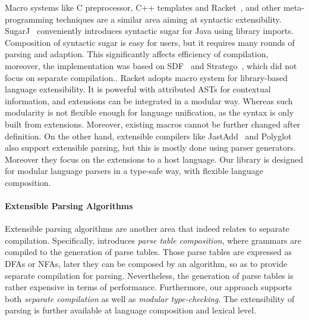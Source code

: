 Macro systems like C preprocessor, C++ templates and
Racket~\cite{Tobin-Hochstadt2011}, and other meta-programming
techniques are a similar area aiming at syntactic extensibility.
SugarJ~\cite{Erdweg2011} conveniently introduces syntactic sugar
for Java using library imports. Composition of syntactic
sugar is easy for users, but it requires many rounds of parsing
and adaption. This significantly affects efficiency of compilation,
moreover, the implementation was based on SDF~\cite{Heering1989} and
Stratego~\cite{Visser2001}, which did not focus on separate
compilation..
Racket adopts macro system for library-based language extensibility. It is powerful with attributed
ASTs for contextual information, and extensions can be integrated in a modular way. Whereas
such modularity is not flexible enough for language unification, as the syntax is only built from extensions.
Moreover, existing macros cannot be further changed after definition. 
On the other hand, extensible compilers like JastAdd~\cite{Ekman2007} and
Polyglot~\cite{Nystrom2003} also support extensible parsing, but this
is mostly done using parser generators. Moreover
they focus on the extensions to a host language. Our library
is designed for modular language parsers in a type-safe way, with
flexible language composition.

\paragraph{Extensible Parsing Algorithms}
Extensible parsing algorithms are another area that indeed relates to
separate compilation. Specifically, \cite{Bravenboer2009} introduces
\textit{parse table composition}, where grammars are compiled
to the generation of parse tables. Those parse tables are expressed as DFAs or NFAs, later they
can be composed by an algorithm, so as to provide separate compilation
for parsing. Nevertheless, the generation of parse tables is rather
expensive in terms of performance.
Furthermore, our approach supports both \emph{separate compilation}
as well as \emph{modular type-checking}. The extensibility of
parsing is further available at language composition
and lexical level.

